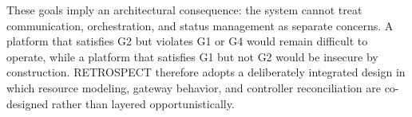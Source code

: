 These goals imply an architectural consequence: the system cannot treat communication, orchestration, and status management as separate concerns. A platform that satisfies G2 but violates G1 or G4 would remain difficult to operate, while a platform that satisfies G1 but not G2 would be insecure by construction. RETROSPECT therefore adopts a deliberately integrated design in which resource modeling, gateway behavior, and controller reconciliation are co-designed rather than layered opportunistically.
